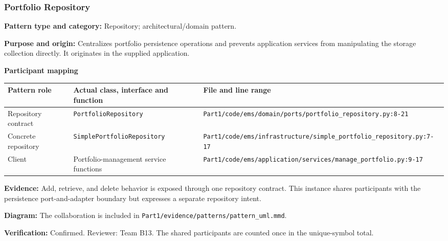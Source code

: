 \documentclass[11pt,a4paper]{article}
\newcommand{\entry}[2]{\textbf{#1:} #2\par}
\newcommand{\codepath}[1]{\nolinkurl{#1}}
\begin{document}
\subsubsection{Portfolio Repository}
\entry{Pattern type and category}{Repository; architectural/domain pattern.}
\entry{Purpose and origin}{Centralizes portfolio persistence operations and prevents application services from manipulating the storage collection directly. It originates in the supplied application.}
\textbf{Participant mapping}\par
\begin{tabularx}{\linewidth}{@{}lXX@{}}
\toprule
Pattern role & Actual class, interface and function & File and line range\\
\midrule
Repository contract & \codepath{PortfolioRepository} & \codepath{Part1/code/ems/domain/ports/portfolio_repository.py:8-21}\\
Concrete repository & \codepath{SimplePortfolioRepository} & \codepath{Part1/code/ems/infrastructure/simple_portfolio_repository.py:7-17}\\
Client & Portfolio-management service functions & \codepath{Part1/code/ems/application/services/manage_portfolio.py:9-17}\\
\bottomrule
\end{tabularx}
\entry{Evidence}{Add, retrieve, and delete behavior is exposed through one repository contract. This instance shares participants with the persistence port-and-adapter boundary but expresses a separate repository intent.}
\entry{Diagram}{The collaboration is included in \codepath{Part1/evidence/patterns/pattern_uml.mmd}.}
\entry{Verification}{Confirmed. Reviewer: Team B13. The shared participants are counted once in the unique-symbol total.}
\end{document}
